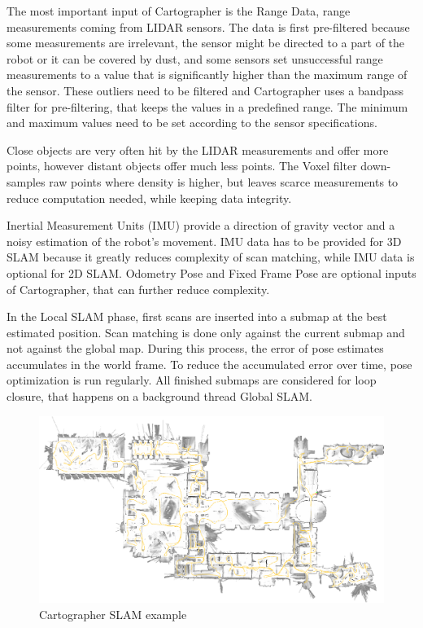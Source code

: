 The most important input of Cartographer is the Range Data, range measurements coming from LIDAR sensors. The data is first 
pre-filtered because some measurements are irrelevant, the sensor might be directed to a part of the robot or it can be covered
by dust, and some sensors set unsuccessful range measurements to a value that is significantly higher than the maximum range of 
the sensor. These outliers need to be filtered and Cartographer uses a bandpass filter for pre-filtering, that keeps the values
in a predefined range. The minimum and maximum values need to be set according to the sensor specifications. 

Close objects are very often hit by the LIDAR measurements and offer more points, however distant objects offer much less points.
The Voxel filter down-samples raw points where density is higher, but leaves scarce measurements to reduce computation needed,
while keeping data integrity.

Inertial Measurement Units (IMU) provide a direction of gravity vector and a noisy estimation of the robot's movement. IMU data
has to be provided for 3D SLAM because it greatly reduces complexity of scan matching, while IMU data is optional for 2D SLAM.
Odometry Pose and Fixed Frame Pose are optional inputs of Cartographer, that can further reduce complexity.

In the Local SLAM phase, first scans are inserted into a submap at the best estimated position. Scan matching is done only against
the current submap and not against the global map. During this process, the error of pose estimates accumulates in the world frame. 
To reduce the accumulated error over time, pose optimization is run regularly. All finished submaps are considered for loop 
closure, that happens on a background thread Global SLAM.




\begin{figure}[!ht]
    \centering
	\includegraphics[width=140mm, keepaspectratio]{figures/cartographer_example.png}
    \caption{Cartographer SLAM example\cite{CartographerDocumentation}}
    \label{fig:cartographer_slam_example}
\end{figure}



